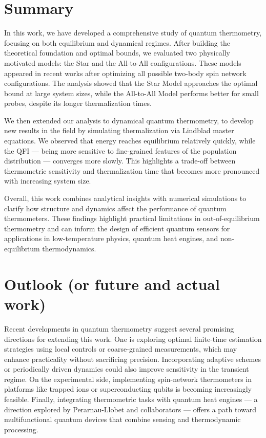\section{Summary}
In this work, we have developed a comprehensive study of quantum thermometry, focusing on both equilibrium and dynamical regimes. After building the theoretical foundation and optimal bounds, we evaluated two physically motivated models: the Star and the All-to-All configurations. These models appeared in recent works after optimizing all possible two-body spin network configurations. The analysis showed that the Star Model approaches the optimal bound at large system sizes, while the All-to-All Model performs better for small probes, despite its longer thermalization times.

We then extended our analysis to dynamical quantum thermometry, to develop new results in the field by simulating thermalization via Lindblad master equations. We observed that energy reaches equilibrium relatively quickly, while the QFI — being more sensitive to fine-grained features of the population distribution — converges more slowly. This highlights a trade-off between thermometric sensitivity and thermalization time that becomes more pronounced with increasing system size.

Overall, this work combines analytical insights with numerical simulations to clarify how structure and dynamics affect the performance of quantum thermometers. These findings highlight practical limitations in out-of-equilibrium thermometry and can inform the design of efficient quantum sensors for applications in low-temperature physics, quantum heat engines, and non-equilibrium thermodynamics.

\section{Outlook (or future and actual work)}
Recent developments in quantum thermometry suggest several promising directions for extending this work. One is exploring optimal finite-time estimation strategies using local controls or coarse-grained measurements, which may enhance practicality without sacrificing precision. Incorporating adaptive schemes or periodically driven dynamics could also improve sensitivity in the transient regime. On the experimental side, implementing spin-network thermometers in platforms like trapped ions or superconducting qubits is becoming increasingly feasible. Finally, integrating thermometric tasks with quantum heat engines — a direction explored by Perarnau-Llobet and collaborators — offers a path toward multifunctional quantum devices that combine sensing and thermodynamic processing.
